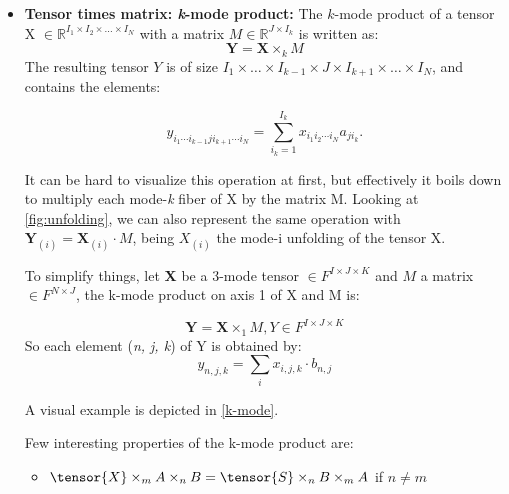 \begin{itemize}
    \item  \textbf{Tensor times matrix: \textit{k}-mode product:} 
            The $k$-mode product of a tensor X $\in \mathbb{R}^{I_{1} \times I_{2} \times \ldots \times I_{N}}$ with a matrix $M \in \mathbb{R}^{J \times I_{k}}$ is written as: 
           \begin{equation}
                \textbf{Y} = \textbf{X} \times_{k} M
           \end{equation}
            The resulting tensor $Y$ is of size $I_{1} \times \ldots \times I_{k-1} \times J \times I_{k+1} \times \ldots \times I_{N}$, and contains the elements:

            $$ 
             y_{i_{1}  \cdots  i_{k-1}  j  i_{k+1}  \cdots  i_{N}} =   \sum_{i_{k} = 1}^{I_{k}} x_{i_{1}  i_{2}  \cdots  i_{N}} a_{ji_{k}}.
            $$
             
             It can be hard to visualize this operation at first, but effectively it boils down to 
             multiply each mode-\textit{k} fiber of X by the matrix M. Looking at \ref{fig:unfolding}, we can also represent the same operation with 
             $ \textbf{Y}_{(i)} = \textbf{X}_{(i)} \cdot M$, being $X_{(i)}$ the mode-i unfolding of the tensor X. \newline
             
             To simplify things, let \textbf{X} be a 3-mode tensor $\in F^{I \times J \times K}$ and $M$ a matrix $\in F^{N \times J}$, the k-mode product on axis 1 of X and M is:
            
            \begin{equation}
                        \textbf{Y} = \textbf{X} \times_{1} M, Y \in F^{I \times J \times K} 
            \end{equation}
            So each element (\textit{n, j, k}) of Y is obtained by: 
            \begin{equation}
                y_{n,j,k} = \sum_{i} x_{i,j,k}  \cdot  b_{n,j}  
            \end{equation}
            
            A visual example is depicted in \ref{k-mode}.
            
                        
            Few interesting properties of the k-mode product are: \\
            \begin{itemize}
                \item  $\tensor{X} \times_{m} A \times_{n} B = \tensor{S} \times_{n} B \times_{m} A$ if $n \neq m$ \\
                

\end{itemize}
\end{itemize}
